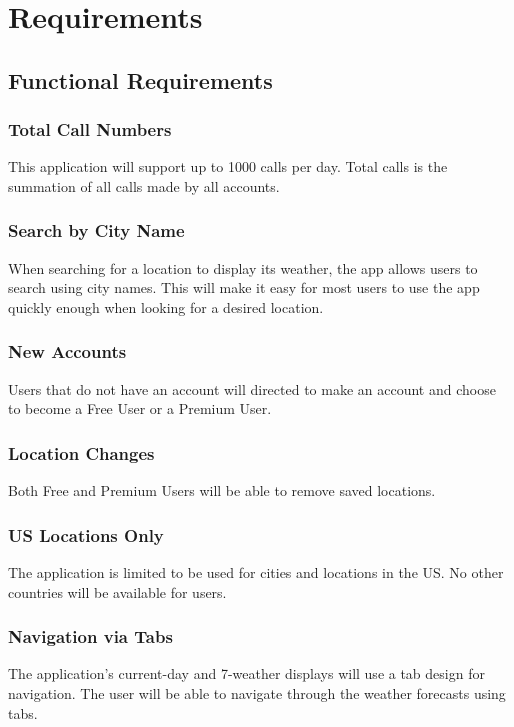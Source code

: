 \documentclass{scrreprt}
\begin{document}
\chapter{Requirements}

\section{Functional Requirements}

\subsection{Total Call Numbers}
This application will support up to 1000 calls per day. Total calls is the summation of all calls made by all accounts.	

\subsection{Search by City Name}
When searching for a location to display its weather, the app allows users to search using city names. This will make it easy for most users to use the app quickly enough when looking for a desired location.

\subsection{New Accounts}
Users that do not have an account will directed to make an account and choose to become a Free User or a Premium User.

\subsection{Location Changes}
Both Free and Premium Users will be able to remove saved locations.

\subsection{US Locations Only}
The application is limited to be used for cities and locations in the US. No other countries will be available for users.

\subsection{Navigation via Tabs}
The application’s current-day and 7-weather displays will use a tab design for navigation. The user will be able to navigate through the weather forecasts using tabs.
\end{document}
